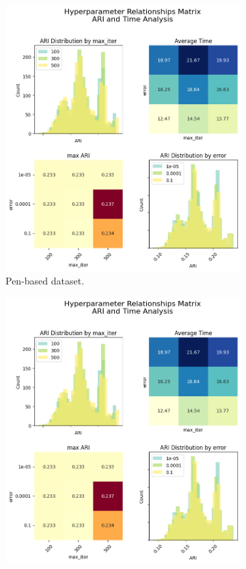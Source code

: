 \begin{figure}[H]
    \centering
    \begin{subfigure}{0.32\textwidth}
        \centering
        \includegraphics[width=\linewidth]{figures/FuzzyCMeans/penBased_error_iter_pairplot.png}
        \caption{Pen-based dataset.}
    \end{subfigure}
    \begin{subfigure}{0.32\textwidth}
        \centering
        \includegraphics[width=\linewidth]{figures/FuzzyCMeans/mushroom_error_iter_pairplot.png}

\end{subfigure}
\end{figure}
